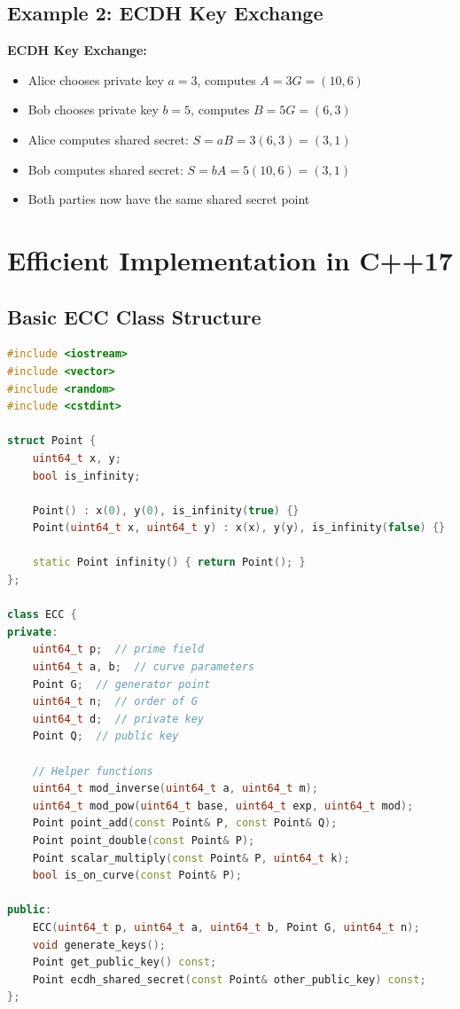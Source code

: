 \documentclass[11pt,a4paper]{article}
\begin{document}
\subsection{Example 2: ECDH Key Exchange}

\begin{examplebox}
\textbf{ECDH Key Exchange:}
\begin{itemize}
    \item Alice chooses private key $a = 3$, computes $A = 3G = (10, 6)$
    \item Bob chooses private key $b = 5$, computes $B = 5G = (6, 3)$
    \item Alice computes shared secret: $S = aB = 3(6, 3) = (3, 1)$
    \item Bob computes shared secret: $S = bA = 5(10, 6) = (3, 1)$
    \item Both parties now have the same shared secret point
\end{itemize}
\end{examplebox}

\section{Efficient Implementation in C++17}

\subsection{Basic ECC Class Structure}

\begin{lstlisting}[language=C++, caption=Basic ECC Class Structure]
#include <iostream>
#include <vector>
#include <random>
#include <cstdint>

struct Point {
    uint64_t x, y;
    bool is_infinity;
    
    Point() : x(0), y(0), is_infinity(true) {}
    Point(uint64_t x, uint64_t y) : x(x), y(y), is_infinity(false) {}
    
    static Point infinity() { return Point(); }
};

class ECC {
private:
    uint64_t p;  // prime field
    uint64_t a, b;  // curve parameters
    Point G;  // generator point
    uint64_t n;  // order of G
    uint64_t d;  // private key
    Point Q;  // public key
    
    // Helper functions
    uint64_t mod_inverse(uint64_t a, uint64_t m);
    uint64_t mod_pow(uint64_t base, uint64_t exp, uint64_t mod);
    Point point_add(const Point& P, const Point& Q);
    Point point_double(const Point& P);
    Point scalar_multiply(const Point& P, uint64_t k);
    bool is_on_curve(const Point& P);

public:
    ECC(uint64_t p, uint64_t a, uint64_t b, Point G, uint64_t n);
    void generate_keys();
    Point get_public_key() const;
    Point ecdh_shared_secret(const Point& other_public_key) const;
};
\end{lstlisting}
\end{document}
